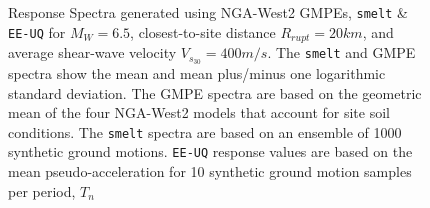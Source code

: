 \begin{figure}[!htbp]
  \caption[Response Spectra generated using NGA-West2
    GMPEs, \texttt{smelt} \& \texttt{EE-UQ} for $M_W = 6.5$, $R_{rupt}
    = 20km$, and $V_{s_{30}} = 400m/s$]
    {Response Spectra generated using NGA-West2
    GMPEs, \texttt{smelt} \& \texttt{EE-UQ} for $M_W = 6.5$,
    closest-to-site distance $R_{rupt} = 20km$, and average shear-wave
    velocity $V_{s_{30}} = 400m/s$. The \texttt{smelt} and GMPE
    spectra show the mean and mean plus/minus one logarithmic standard
    deviation. The GMPE spectra are based on the geometric mean of the
    four NGA-West2 models that account for site soil
    conditions. The \texttt{smelt} spectra are based on an ensemble of
    1000 synthetic ground motions. \texttt{EE-UQ} response values are
    based on the mean pseudo-acceleration for 10 synthetic ground
    motion samples per period, $T_n$}
  \label{fig:stochastic_validation}
\end{figure}
